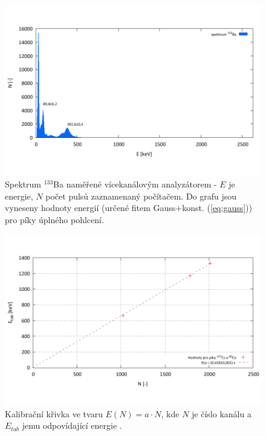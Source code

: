 \documentclass[english]{article}
\begin{document}
	\begin{figure}[h!]
	\begin{center}
	    \vspace*{-1cm}
		\includegraphics[width=\linewidth]{../gnuplot/solo/Ba.pdf}
	    \vspace*{-2cm}
		\caption{Spektrum $^{133}$Ba naměřené vícekanálovým analyzátorem - $E$ je energie, $N$ počet pulsů zaznamenaný počítačem. Do grafu jsou vyneseny hodnoty energií (určené fitem Gauss+konst. (\ref{eq:gauss})) pro píky úplného pohlcení.}
		\label{fig:g_Ba_vice}
	\end{center}
	\end{figure}	
	
	\begin{figure}[h!]
	\begin{center}
	    \vspace*{-1cm}
		\includegraphics[width=\linewidth]{../gnuplot/kalib.pdf}
	    \vspace*{-2cm}
		\caption{Kalibrační křivka ve tvaru $E(N) = a\cdot N$, kde $N$ je číslo kanálu a $E_{tab}$ jemu odpovídající energie \cite{bib:net}.}
		\label{fig:g_kalib}
	\end{center}
	\end{figure}	
	
\end{document}
